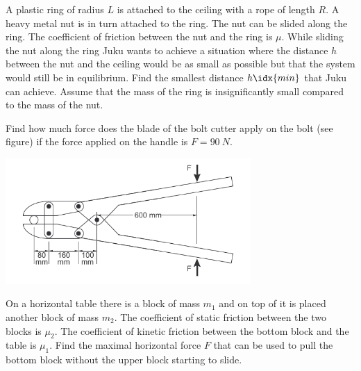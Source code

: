 \documentclass[11pt]{article}
\begin{document}

\probeng
A plastic ring of radius $L$ is attached to the ceiling with a rope of length $R$. A heavy metal nut is in turn attached to the ring. The nut can be slided along the ring. The coefficient of friction between the nut and the ring is $\mu$. While sliding the nut along the ring Juku wants to achieve a situation where the distance $h$ between the nut and the ceiling would be as small as possible but that the system would still be in equilibrium. Find the smallest distance $h\idx{min}$ that Juku can achieve. Assume that the mass of the ring is insignificantly small compared to the mass of the nut.
\probend
\bigskip


\probeng
Find how much force does the blade of the bolt cutter apply on the bolt (see figure) if the force applied on the handle is $F = \SI{90}{N}$.
\begin{center}
    \includegraphics[width=0.7\textwidth]{2015-v2g-07-poldiloikur}
  \end{center}
\probend
\bigskip


\probeng
On a horizontal table there is a block of mass $m_1$ and on top of it is placed another block of mass $m_2$. The coefficient of static friction between the two blocks is $\mu_2$. The coefficient of kinetic friction between the bottom block and the table is $\mu_1$. Find the maximal horizontal force $F$ that can be used to pull the bottom block without the upper block starting to slide.
\probend
\bigskip

\end{document}
